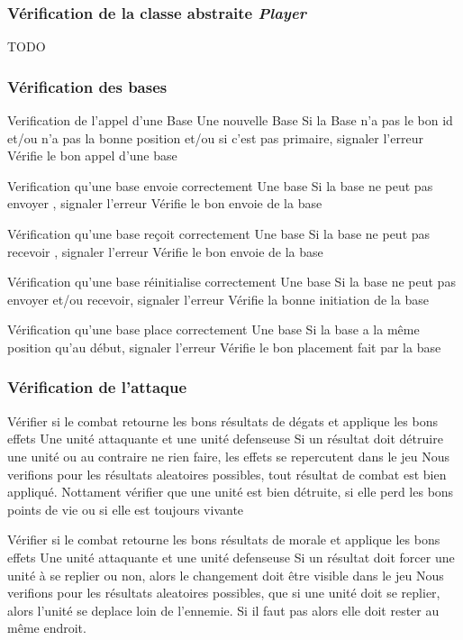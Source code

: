\subsubsection{Vérification de la classe abstraite \emph{Player}}

TODO

\subsubsection{Vérification des bases}

\mytest
{Verification de l'appel d'une Base}
{Une nouvelle Base}
{Si la Base n'a pas le bon id et/ou n'a pas la bonne position et/ou si c'est pas primaire, signaler l'erreur }
{Vérifie le bon appel d'une base}

\mytest
{Verification qu'une base envoie correctement}
{Une base}
{Si la base ne peut pas envoyer ,  signaler l'erreur }
{Vérifie le bon envoie de la base }

\mytest
{Vérification qu'une base reçoit correctement}
{Une base}
{Si la base ne peut pas recevoir ,  signaler l'erreur }
{Vérifie le bon envoie de la base }

\mytest
{Vérification qu'une base réinitialise correctement}
{Une base}
{Si la base ne peut pas envoyer et/ou recevoir,  signaler l'erreur }
{Vérifie la bonne initiation de la base }

\mytest
{Vérification qu'une base place correctement}
{Une base}
{Si la base a la même position qu'au début,  signaler l'erreur }
{Vérifie le bon placement fait par la  base }

\subsubsection{Vérification de l'attaque}

\mytest
{Vérifier si le combat retourne les bons résultats de dégats et applique les bons effets}
{Une unité attaquante et une unité defenseuse}
{Si un résultat doit détruire une unité ou au contraire ne rien faire, les effets se repercutent dans le jeu}
{Nous verifions pour les résultats aleatoires possibles, tout résultat de combat est bien appliqué. Nottament vérifier
    que une unité est bien détruite, si elle perd les bons points de vie ou si elle est toujours vivante}

\mytest
{Vérifier si le combat retourne les bons résultats de morale et applique les bons effets}
{Une unité attaquante et une unité defenseuse}
{Si un résultat doit forcer une unité à se replier ou non, alors le changement doit être visible dans le jeu}
{Nous verifions pour les résultats aleatoires possibles, que si une unité doit se replier, alors l'unité se
    deplace loin de l'ennemie. Si il faut pas alors elle doit rester au même endroit.}

